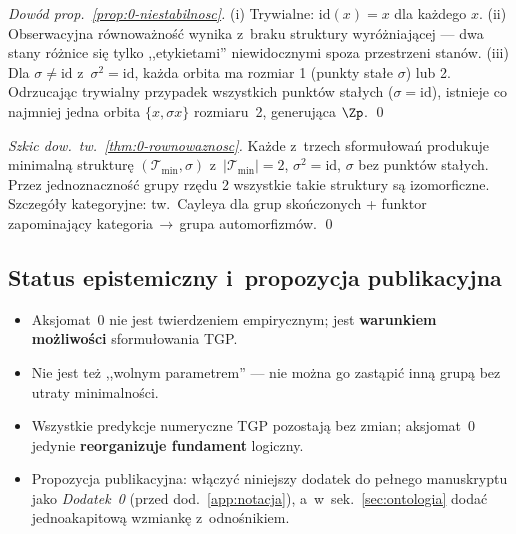 \begin{proof}[Dow\'od prop.~\ref{prop:0-niestabilnosc}]
(i) Trywialne: $\mathrm{id}(x) = x$ dla ka\.zdego $x$. (ii)
Obserwacyjna r\'ownowa\.zno\'s\'c wynika z~braku struktury wyr\'o\.zniaj\k{a}cej
--- dwa stany r\'o\.znice si\k{e} tylko ,,etykietami'' niewidocznymi
spoza przestrzeni stan\'ow. (iii) Dla $\sigma \neq \mathrm{id}$
z~$\sigma^2 = \mathrm{id}$, ka\.zda orbita ma rozmiar 1 (punkty
sta\l{}e $\sigma$) lub 2. Odrzucaj\k{a}c trywialny przypadek wszystkich
punkt\'ow sta\l{}ych ($\sigma = \mathrm{id}$), istnieje co najmniej
jedna orbita $\{x, \sigma x\}$ rozmiaru~2, generuj\k{a}ca $\Zp$. \qed
\end{proof}

\begin{proof}[Szkic dow.~tw.~\ref{thm:0-rownowaznosc}]
Ka\.zde z~trzech sformu\l{}owa\'n produkuje minimaln\k{a} struktur\k{e}
$(\mathcal{T}_{\min}, \sigma)$ z~$|\mathcal{T}_{\min}| = 2$,
$\sigma^2 = \mathrm{id}$, $\sigma$ bez punkt\'ow sta\l{}ych.
Przez jednoznaczno\'s\'c grupy rz\k{e}du 2 wszystkie takie struktury
s\k{a} izomorficzne. Szczeg\'o\l{}y kategoryjne: tw.~Cayleya dla
grup sko\'nczonych + funktor zapominaj\k{a}cy kategoria\,$\to$\,grupa
automorfizm\'ow. \qed
\end{proof}

\subsection{Status epistemiczny i~propozycja publikacyjna}%
\label{app:0-status}

\begin{itemize}[nosep]
  \item Aksjomat~0 nie jest twierdzeniem empirycznym; jest
    \textbf{warunkiem mo\.zliwo\'sci} sformu\l{}owania TGP.
  \item Nie jest te\.z ,,wolnym parametrem'' --- nie mo\.zna go
    zast\k{a}pi\'c inn\k{a} grup\k{a} bez utraty minimalno\'sci.
  \item Wszystkie predykcje numeryczne TGP pozostaj\k{a} bez zmian;
    aksjomat~0 jedynie \textbf{reorganizuje fundament} logiczny.
  \item Propozycja publikacyjna: w\l{}\k{a}czy\'c niniejszy dodatek
    do pe\l{}nego manuskryptu jako \emph{Dodatek~0} (przed
    dod.~\ref{app:notacja}), a~w~sek.~\ref{sec:ontologia} doda\'c
    jednoakapitow\k{a} wzmiank\k{e} z~odnośnikiem.
\end{itemize}

